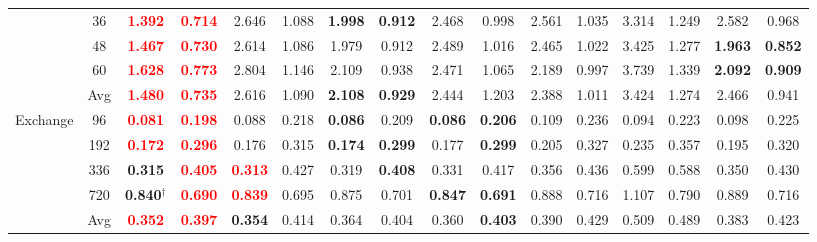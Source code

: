 \documentclass[a4paper,fleqn]{cas-sc}
\begin{document}
\begin{table}[t]
{\begin{tabular}{c|c|cc|cc|cc|cc|cc|cc|cc}
& 36 & \textbf{\textcolor{red}{1.392}} & \textbf{\textcolor{red}{0.714}} & 2.646 & 1.088 & \textbf{1.998} & \textbf{0.912} & 2.468 & 0.998 & 2.561 & 1.035 & 3.314 & 1.249 & 2.582 & 0.968 \\
& 48 & \textbf{\textcolor{red}{1.467}} & \textbf{\textcolor{red}{0.730}} & 2.614 & 1.086 & 1.979 & 0.912 & 2.489 & 1.016 & 2.465 & 1.022 & 3.425 & 1.277 & \textbf{1.963} & \textbf{0.852} \\
& 60 & \textbf{\textcolor{red}{1.628}} & \textbf{\textcolor{red}{0.773}} & 2.804 & 1.146 & 2.109 & 0.938 & 2.471 & 1.065 & 2.189 & 0.997 & 3.739 & 1.339 & \textbf{2.092} & \textbf{0.909} \\
& Avg & \textbf{\textcolor{red}{1.480}} & \textbf{\textcolor{red}{0.735}} & 2.616 & 1.090 & \textbf{2.108} & \textbf{0.929} & 2.444 & 1.203 & 2.388 & 1.011 & 3.424 & 1.274 & 2.466 & 0.941 \\
\midrule
\multirow{5}{*}{Exchange}
& 96 & \textbf{\textcolor{red}{0.081}} & \textbf{\textcolor{red}{0.198}} & 0.088 & 0.218 & \textbf{0.086} & 0.209 & \textbf{0.086} & \textbf{0.206} & 0.109 & 0.236 & 0.094 & 0.223 & 0.098 & 0.225 \\
& 192 & \textbf{\textcolor{red}{0.172}} & \textbf{\textcolor{red}{0.296}} & 0.176 & 0.315 & \textbf{0.174} & \textbf{0.299} & 0.177 & \textbf{0.299} & 0.205 & 0.327 & 0.235 & 0.357 & 0.195 & 0.320 \\
& 336 & \textbf{0.315} & \textbf{\textcolor{red}{0.405}} & \textbf{\textcolor{red}{0.313}} & 0.427 & 0.319 & \textbf{0.408} & 0.331 & 0.417 & 0.356 & 0.436 & 0.599 & 0.588 & 0.350 & 0.430 \\
& 720 & \textbf{0.840$^\dagger$} & \textbf{\textcolor{red}{0.690}} & \textbf{\textcolor{red}{0.839}} & 0.695 & 0.875 & 0.701 & \textbf{0.847} & \textbf{0.691} & 0.888 & 0.716 & 1.107 & 0.790 & 0.889 & 0.716 \\
& Avg & \textbf{\textcolor{red}{0.352}} & \textbf{\textcolor{red}{0.397}} & \textbf{0.354} & 0.414 & 0.364 & 0.404 & 0.360 & \textbf{0.403} & 0.390 & 0.429 & 0.509 & 0.489 & 0.383 & 0.423 \\
\bottomrule
\end{tabular}}
\par\smallskip
\begin{minipage}{\textwidth}

\end{minipage}
\end{table}
\end{document}
